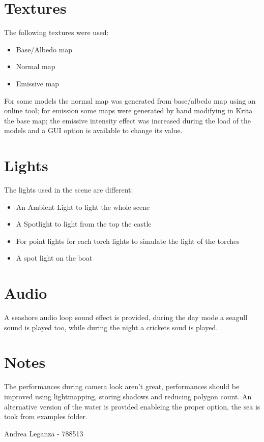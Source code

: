 \documentclass[10pt,a4paper]{article}
\begin{document}
\section{Textures}
The following textures were used:

\begin{itemize}
\item Base/Albedo map
\item Normal map
\item Emissive map
\end{itemize}

For some models the normal map was generated from base/albedo map using an online tool; for emission some maps were generated by hand modifying in Krita the base map; the emissive intensity effect was increased during the load of the models and a GUI option is available to change its value.

\section{Lights}
The lights used in the scene are different:

\begin{itemize}
\item An Ambient Light to light the whole scene
\item A Spotlight to light from the top the castle
\item For point lights for each torch lights to simulate the light of the torches
\item A spot light on the boat
\end{itemize}

\section{Audio}

A seashore audio loop sound effect is provided, during the day mode a seagull sound is played too, while during the night a crickets soud is played.

\section{Notes}

The performances during camera look aren't great, performances should be improved  using lightmapping, storing shadows and reducing polygon count. An alternative version of the water is provided enableing the proper option, the sea is took from examples folder.

\bigbreak
\bigbreak
Andrea Leganza - 788513
\end{document}
